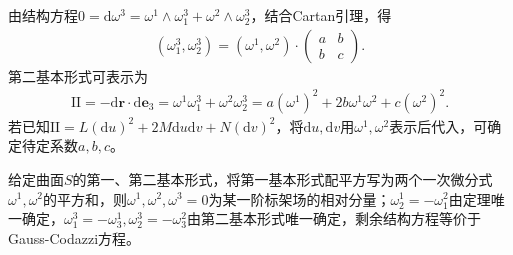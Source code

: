 \documentclass[../../main.tex]{subfiles}%
\begin{document}
由结构方程$0=\mathrm{d}\omega^3=\omega^1\wedge\omega_1^3+\omega^2\wedge\omega_2^3$，结合Cartan引理，得
\begin{align}
(\omega_1^3,\omega_2^3)=(\omega^1,\omega^2)\cdot\begin{pmatrix}a&b\\b&c\end{pmatrix}.
\label{eq:cartan-lemma-omega3}
\end{align}
第二基本形式可表示为
\begin{align}
\mathrm{II}=-\mathrm{d}\boldsymbol{r}\cdot\mathrm{d}\boldsymbol{e}_3=\omega^1\omega_1^3+\omega^2\omega_2^3=a(\omega^1)^2+2b\omega^1\omega^2+c(\omega^2)^2.
\label{eq:ii-omega-form}
\end{align}
若已知$\mathrm{II}=L(\mathrm{d}u)^2+2M\mathrm{d}u\mathrm{d}v+N(\mathrm{d}v)^2$，将$\mathrm{d}u,\mathrm{d}v$用$\omega^1,\omega^2$表示后代入，可确定待定系数$a,b,c$。

\begin{proposition}
给定曲面$S$的第一、第二基本形式，将第一基本形式配平方写为两个一次微分式$\omega^1,\omega^2$的平方和，则$\omega^1,\omega^2,\omega^3=0$为某一阶标架场的相对分量；$\omega_2^1=-\omega_1^2$由定理唯一确定，$\omega_1^3=-\omega_3^1,\omega_2^3=-\omega_3^2$由第二基本形式唯一确定，剩余结构方程等价于Gauss-Codazzi方程。
\end{proposition}
\end{document}
